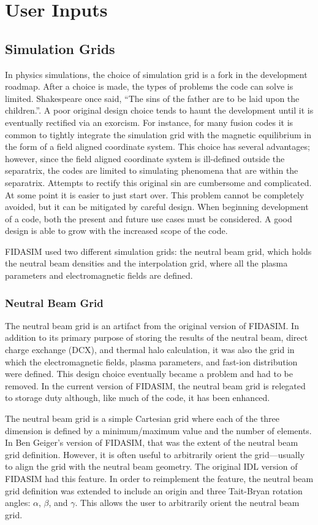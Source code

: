 \section{User Inputs}
\subsection{Simulation Grids}
In physics simulations, the choice of simulation grid is a fork in the development roadmap. After a choice is made, the types of problems the code can solve is limited. Shakespeare once said, “The sins of the father are to be laid upon the children.”. A poor original design choice tends to haunt the development until it is eventually rectified via an exorcism. For instance, for many fusion codes it is common to tightly integrate the simulation grid with the magnetic equilibrium in the form of a field aligned coordinate system. This choice has several advantages; however, since the field aligned coordinate system is ill-defined outside the separatrix, the codes are limited to simulating phenomena that are within the separatrix. Attempts to rectify this original sin are cumbersome and complicated. At some point it is easier to just start over. 
This problem cannot be completely avoided, but it can be mitigated by careful design. When beginning development of a code, both the present and future use cases must be considered. A good design is able to grow with the increased scope of the code.

FIDASIM used two different simulation grids: the neutral beam grid, which holds the neutral beam densities and the interpolation grid, where all the plasma parameters and electromagnetic fields are defined.
\subsubsection{Neutral Beam Grid}
The neutral beam grid is an artifact from the original version of FIDASIM. In addition to its primary purpose of storing the results of the neutral beam, direct charge exchange (DCX), and thermal halo calculation, it was also the grid in which the electromagnetic fields, plasma parameters, and fast-ion distribution were defined. This design choice eventually became a problem and had to be removed. In the current version of FIDASIM, the neutral beam grid is relegated to storage duty although, like much of the code, it has been enhanced.

The neutral beam grid is a simple Cartesian grid where each of the three dimension is defined by a minimum/maximum value and the number of elements. In Ben Geiger's version of FIDASIM, that was the extent of the neutral beam grid definition. However, it is often useful to arbitrarily orient the grid---usually to align the grid with the neutral beam geometry. The original IDL version of FIDASIM had this feature. In order to reimplement the feature, the neutral beam grid definition was extended to include an origin and three Tait-Bryan rotation angles: $\alpha$, $\beta$, and $\gamma$. This allows the user to arbitrarily orient the neutral beam grid.

